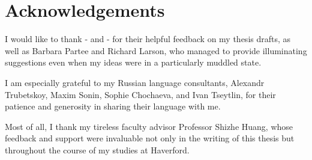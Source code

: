 \section*{Acknowledgements}
I would like to thank - and - for their helpful feedback on my thesis drafts, as well as Barbara Partee and Richard Larson, who managed to provide illuminating suggestions even when my ideas were in a particularly muddled state.

I am especially grateful to my Russian language consultants, Alexandr Trubetskoy, Maxim Sonin, Sophie Chochaeva, and Ivan Tseytlin, for their patience and generosity in sharing their language with me.

Most of all, I thank my tireless faculty advisor Professor Shizhe Huang, whose feedback and support were invaluable not only in the writing of this thesis but throughout the course of my studies at Haverford.